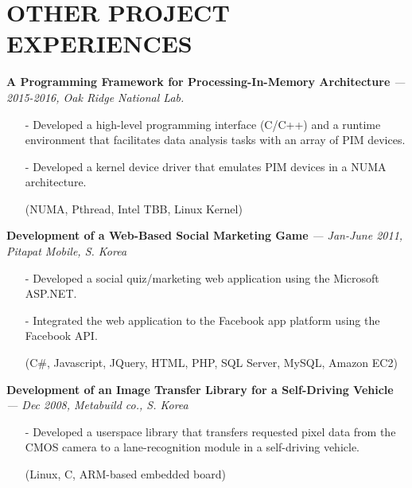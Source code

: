 \section{OTHER PROJECT EXPERIENCES} 
\vspace{0.03in}

  {\bf A Programming Framework for Processing-In-Memory Architecture}
   {\it \footnotesize --- 2015-2016, Oak Ridge National Lab.}
   \begin{itemize}[leftmargin=*]
    \setlength\itemsep{-0.02in}
    \item[-] Developed a high-level programming interface (C/C++) and a runtime environment that
             facilitates data analysis tasks with an array of PIM devices.
    \item[-] Developed a kernel device driver that emulates PIM devices in a NUMA architecture.
    \item[] {\small(NUMA, Pthread, Intel TBB, Linux Kernel)}
   \end{itemize}

  \vspace{-0.15in}
  {\bf Development of a Web-Based Social Marketing Game}
    {\it \footnotesize --- Jan-June 2011, Pitapat Mobile, S. Korea}
    \begin{itemize}[leftmargin=*]
    \setlength\itemsep{-0.02in}
     \item[-] Developed a social quiz/marketing web application using 
              the Microsoft ASP.NET. %
     \item[-] Integrated the web application to the Facebook app platform using the Facebook API.
     \item[]  {\small(C\#, Javascript, JQuery, HTML, PHP, SQL Server, MySQL, Amazon EC2)}
\end{itemize}

  \vspace{-0.15in}
  {\bf Development of an Image Transfer Library for a Self-Driving Vehicle}
    {\it \footnotesize --- Dec 2008, Metabuild co., S. Korea}
    \begin{itemize}[leftmargin=*]
    \setlength\itemsep{-0.02in}
     \item[-] Developed a userspace library that transfers requested pixel data
              from the CMOS camera
              to a lane-recognition module in a self-driving vehicle.
     \item[] {\small(Linux, C, ARM-based embedded board)}
\end{itemize}

